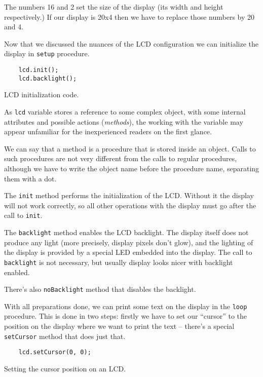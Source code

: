 \documentclass[../sparc.tex]{subfiles}
\begin{document}
The numbers 16 and 2 set the size of the display (its width and height
respectively.)  If our display is 20x4 then we have to replace those numbers by
20 and 4.

Now that we discussed the nuances of the LCD configuration we can initialize the
display in \texttt{setup} procedure.

\begin{listing}[ht]
  \begin{verbatim}
    lcd.init();
    lcd.backlight();
  \end{verbatim}
  \caption{LCD initialization code.}
  \label{listing:game-dev-lcd-init}
\end{listing}

As \texttt{lcd} variable stores a reference to some complex object,
with some internal attributes and possible actions (\emph{methods}), the working
with the variable may appear unfamiliar for the inexperienced readers on the
first glance.

We can say that a \gls{method} is a procedure that is stored inside an object.
Calls to such procedures are not very different from the calls to regular
procedures, although we have to write the object name before the procedure name,
separating them with a dot.

The \texttt{init} method performs the initialization of the LCD.
Without it the display will not work correctly, so all other operations with the
display must go after the call to \texttt{init}.

The \texttt{backlight} method enables the LCD backlight.  The display
itself does not produce any light (more precisely, display pixels don't glow),
and the lighting of the display is provided by a special LED embedded into the
display.  The call to \texttt{backlight} is not necessary, but usually
display looks nicer with backlight enabled.

There's also \texttt{noBacklight} method that disables the backlight.

With all preparations done, we can print some text on the display in the
\texttt{loop} procedure.  This is done in two steps: firstly we have to
set our ``cursor'' to the position on the display where we want to print the
text -- there's a special \texttt{setCursor} method that does just that.

\begin{listing}[ht]
  \begin{verbatim}
    lcd.setCursor(0, 0);
  \end{verbatim}
  \caption{Setting the cursor position on an LCD.}
  \label{listing:game-dev-lcd-set-cursor}
\end{listing}
\end{document}
